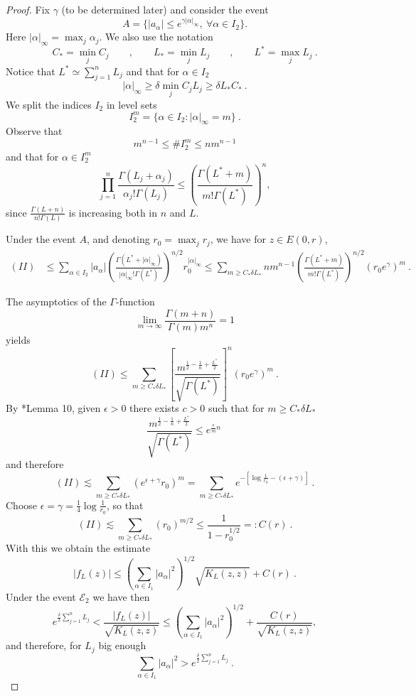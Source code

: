 \documentclass[12pt,twoside,final,amsfonts]{amsart}
\theoremstyle{plain}
\theoremstyle{definition}
\theoremstyle{definition}
\begin{document}
\begin{proof}
Fix $\gamma$ (to be determined later) and consider the event
\[
 A=\bigl\{ |a_\alpha|\leq e^{\gamma |\alpha|_\infty},\ \forall\alpha\in I_2 \bigr\}.
\]
Here $|\alpha|_\infty=\max_j \alpha_j$. We also use the notation
\[
 C_*=\min_j C_j\qquad ,\qquad L_*=\min_j L_j\qquad ,\qquad  L^*=\max_j L_j\ .
\]
Notice that $L^*\simeq{\sum_{j=1}^n L_j}$ and that for $\alpha\in I_2$
\[
 |\alpha|_\infty\geq\delta\min_j C_j L_j\geq\delta L_*  C_*\ .
\]
We split the indices $I_2$ in level sets
\[
 I_2^m=\bigl\{\alpha\in I_2 : |\alpha|_\infty=m\bigr\}\ .
\]
Observe that
\begin{equation}\label{i2m}
 m^{n-1}\leq \# I_2^m\leq n m^{n-1}
\end{equation}
and that for $\alpha\in I_2^m$ 
\[
 \prod_{j=1}^n \frac{\Gamma(L_j+\alpha_j)}{\alpha_j! \Gamma(L_j)}\leq \left(\frac{\Gamma(L^*+m)}{m! \Gamma(L^*)}\right)^n,
\]
since $\frac{\Gamma(L+n)}{n! \Gamma(L)}$ is increasing both in $n$ and $L$.

Under the event $A$, and denoting $r_0=\max_j r_j$, we have for $z\in E(0,r)$,
\begin{align*}
(II)& \leq 
\sum_{\alpha\in I_2} |a_\alpha|\left(\frac{\Gamma(L^*+|\alpha|_\infty)}{|\alpha|_\infty!\Gamma(L^*) }\right)^{n/2} r_0^{|\alpha|_\infty}
\leq \sum_{m\geq C_*\delta L_*} n m^{n-1} \left(\frac{\Gamma(L^*+m)}{m! \Gamma(L^*) }\right)^{n/2} (r_0 e^\gamma)^m\ .
\end{align*}

The asymptotics of the $\Gamma$-function
\begin{equation}\label{asymptoticsGamma}
 \lim_{m\to\infty}\frac{\Gamma(m+n)}{\Gamma(m) m^n}=1
\end{equation}
yields
\[
 (II)\leq \sum_{m\geq C_*\delta L_*}\left[\frac{m^{\frac 12-\frac 1n+\frac{L^*}2}}{\sqrt{\Gamma(L^*)}}\right]^n (r_0 e^\gamma)^m\ .
\]
By \cite{BMP}*{Lemma 10}, given $\epsilon>0$ there exists $c>0$ such that for $m\geq C_*\delta L_*$
\[
 \frac{m^{\frac 12-\frac 1n+\frac{L^*}2}}{\sqrt{\Gamma(L^*)}}\leq e^{\frac{\epsilon}m n}\ 
\]
and therefore
\[
 (II)\lesssim \sum_{m\geq C_*\delta L_*} (e^{\epsilon+\gamma}r_0)^m= \sum_{m\geq C_*\delta L_*} e^{-[\log\frac1{r_0}-(\epsilon+\gamma)]}\ .
\]
Choose $\epsilon=\gamma=\frac 14 \log\frac1{r_0}$, so that
\[
 (II)\lesssim \sum_{m\geq C_*\delta L_*} (r_0)^{m/2}\leq\frac 1{1-r_0^{1/2}}=:C(r)\ .
\]
With this we obtain the estimate
\[
 |f_L(z)|\leq \left(\sum_{\alpha\in I_1}|a_{\alpha}|^2\right)^{1/2} \sqrt{K_L(z,z)}+ C(r)\ .
\]
Under the event $\mathcal E_2$  we have then
\[
 e^{\frac{\delta}2 {\sum_{j=1}^n L_j}}<\frac{|f_L(z)|}{\sqrt{K_L(z,z)}}\leq \left(\sum_{\alpha\in I_1}|a_{\alpha}|^2\right)^{1/2}+
 \frac{C(r)}{\sqrt{K_L(z,z)}},
\]
and therefore, for $L_j$ big enough
\begin{equation}\label{equ}
 \sum_{\alpha\in I_1}|a_{\alpha}|^2 > e^{\frac{\delta}2 {\sum_{j=1}^n L_j}}\ .
\end{equation}


\end{proof}
\end{document}
